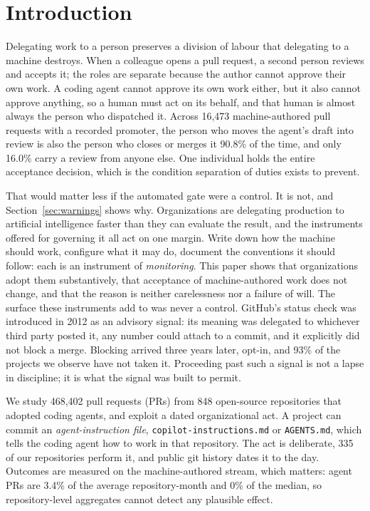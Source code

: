 \documentclass[mnsc]{informs4}
\begin{document}
\maketitle
\section{Introduction}

Delegating work to a person preserves a division of labour that delegating to a
machine destroys. When a colleague opens a pull request, a second person reviews
and accepts it; the roles are separate because the author cannot approve their own
work. A coding agent cannot approve its own work either, but it also cannot
approve anything, so a human must act on its behalf, and that human is almost
always the person who dispatched it. Across 16,473 machine-authored pull requests
with a recorded promoter, the person who moves the agent's draft into review is
also the person who closes or merges it 90.8\% of the time, and only 16.0\% carry a
review from anyone else. One individual holds the entire acceptance decision,
which is the condition separation of duties exists to prevent.

That would matter less if the automated gate were a control. It is not, and
Section~\ref{sec:warnings} shows why. Organizations are delegating production to
artificial intelligence faster than they can evaluate the result, and the
instruments offered for governing it all act on
one margin. Write down how the machine should work, configure what it may do,
document the conventions it should follow: each is an instrument of
\emph{monitoring}. This paper shows that organizations adopt them substantively,
that acceptance of machine-authored work does not change, and that the reason is
neither carelessness nor a failure of will. The surface these instruments add to
was never a control. GitHub's status check was introduced in 2012 as an advisory
signal: its meaning was delegated to whichever third party posted it, any number
could attach to a commit, and it explicitly did not block a merge. Blocking
arrived three years later, opt-in, and 93\% of the projects we observe have not
taken it. Proceeding past such a signal is not a lapse in discipline; it is what
the signal was built to permit.

We study 468,402 pull requests (PRs) from 848 open-source repositories that adopted
coding agents, and exploit a dated organizational act. A project can commit an
\emph{agent-instruction file}, \texttt{copilot-instructions.md} or
\texttt{AGENTS.md}, which tells the coding agent how to work in that repository. The act is deliberate, 335 of our repositories perform it, and public git history
dates it to the day. Outcomes are measured on the machine-authored stream, which
matters: agent PRs are 3.4\% of the average repository-month and 0\% of the median,
so repository-level aggregates cannot detect any plausible effect.
\end{document}

